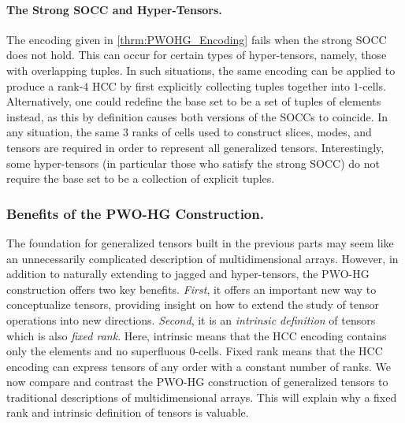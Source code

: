 \documentclass{article}
\theoremstyle{plain}
\theoremstyle{definition}
\theoremstyle{remark}
\let\oldparagraph\paragraph
\renewcommand{\paragraph}[1]{%
	\vspace{-0.5em}%
	\oldparagraph{#1}%
}
\begin{document}
\paragraph{The Strong SOCC and Hyper-Tensors.} The encoding given in \cref{thrm:PWOHG_Encoding} fails when the strong SOCC does not hold. This can occur for certain types of hyper-tensors, namely, those with overlapping tuples. In such situations, the same encoding can be applied to produce a rank-$4$ HCC by first explicitly collecting tuples together into $1$-cells. Alternatively, one could redefine the base set to be a set of tuples of elements instead, as this by definition causes both versions of the SOCCs to coincide. In any situation, the same $3$ ranks of cells used to construct slices, modes, and tensors are required in order to represent all generalized tensors. Interestingly, some hyper-tensors (in particular those who satisfy the strong SOCC) do not require the base set to be a collection of explicit tuples.

\subsubsection{\label{sec:GenTenDisc_Apdx}Benefits of the PWO-HG Construction.}
The foundation for generalized tensors built in the previous parts may seem like an unnecessarily complicated description of multidimensional arrays. However, in addition to naturally extending to jagged and hyper-tensors, the PWO-HG construction offers two key benefits. \textit{First}, it offers an important new way to conceptualize tensors, providing insight on how to extend the study of tensor operations into new directions. \textit{Second}, it is an \textit{intrinsic definition} of tensors which is also \textit{fixed rank}. Here, intrinsic means that the HCC encoding contains only the elements and no superfluous $0$-cells. Fixed rank means that the HCC encoding can express tensors of any order with a constant number of ranks. We now compare and contrast the PWO-HG construction of generalized tensors to traditional descriptions of multidimensional arrays. This will explain why a fixed rank and intrinsic definition of tensors is valuable.
\end{document}
